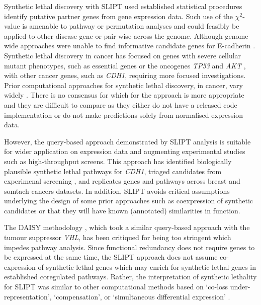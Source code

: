 Synthetic lethal discovery  with \gls{SLIPT} used established statistical procedures identify putative partner genes from gene expression data. Such use of the $\chi^2$-value is amenable to pathway or permutation analyses and could feasibly be applied to other disease gene or pair-wise across the genome. Although genome-wide approaches were unable to find informative candidate genes for E-cadherin \cite{Lu2015}. Synthetic lethal discovery in cancer has focused on genes with severe cellular mutant phenotypes, such as essential genes or the oncogenes \textit{TP53} and \textit{AKT} \cite{Tiong2014, Lu2015, Wang2013}, with other cancer genes, such as \textit{CDH1}, requiring more focused investigations. Prior computational approaches for synthetic lethal discovery, in cancer, vary widely \citep{Tiong2014, Jerby2014, Lu2015, Wappett2016}. There is no consensus for which for the approach is more appropriate and they are difficult to compare as they either do not have a released code implementation or do not make predictions solely from normalised expression data.

However, the query-based approach demonstrated by \gls{SLIPT} analysis is suitable for wider application on expression data and augmenting experimental studies such as high-throughput screens. This approach has identified biologically plausible synthetic lethal pathways for \textit{CDH1}, triaged candidates from experimenal screening \citep{Telford2015}, and replicates genes and pathways across breast and somtach cancers datasets. In addition, \gls{SLIPT} avoids critical assumptions underlying the design of some prior approaches such as coexpression of synthetic candidates or that they will have known (annotated) similarities in function.

The DAISY methodology \cite{Jerby2014}, which took a similar query-based approach with the tumour suppressor \textit{VHL}, has been critiqued for being too stringent \cite{Lu2015} which impedes pathway analysis. Since functional redundancy does not require genes to be expressed at the same time, the \gls{SLIPT} approach does not assume co-expression of synthetic lethal genes which may enrich for synthetic lethal genes in established coregulated pathways. Rather, the interpretation of synthetic lethality for \gls{SLIPT} was similar to other computational methods based on `co-loss under-represent\-at\-ion', `compensation', or `simultaneous differential expression' \cite{Tiong2014, Lu2015, Wang2013}.

